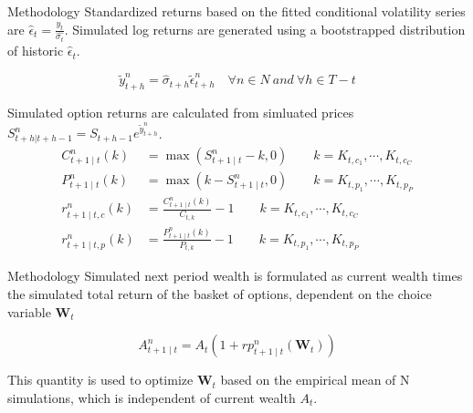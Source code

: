 \documentclass[9pt]{beamer}
\begin{document}
\begin{frame}{Methodology}
Standardized returns based on the fitted conditional volatility series are $\hat{\epsilon}_{t} = \frac{y_{t}}{\hat{\sigma_{t}}}$. Simulated log returns are generated using a bootstrapped distribution of historic $\hat{\epsilon}_{t}$.

\[\tilde{y}^{n}_{t + h} = \hat{\sigma}_{t + h} \tilde{\epsilon}^{n}_{t + h} \quad \forall n \in N \ and \ \forall h \in T - t\]

\vspace{1cm}

Simulated option returns are calculated from simluated prices $S_{t + h|t+h-1}^{n} = S_{t + h - 1} e^{\tilde{y}_{t + h}^{n}}$.
\noindent
\begin{align} 
\nonumber C_{t+1 \mid t}^{n}(k) &= \max (S_{t+1 \mid t}^{n} - k, 0) \quad \quad k = K_{t, c_{1}}, \cdots, K_{t, c_{C}} 
\\ \nonumber P_{t+1 \mid t}^{n}(k) &= \max (k - S_{t+1 \mid t}^{n}, 0) \quad \quad k = K_{t, p_{1}}, \cdots, K_{t, p_{P}}
\\ \nonumber r_{t+1 \mid t, c}^{n}(k) &= \frac{C_{t+1 \mid t}^{n}(k)}{C_{t, k}} - 1 \quad \quad k = K_{t, c_{1}}, \cdots, K_{t, c_{C}}
\\ \nonumber r_{t+1 \mid t, p}^{n}(k) &= \frac{P_{t+1 \mid t}^{n}(k)}{P_{t, k}} - 1 \quad \quad k = K_{t, p_{1}}, \cdots, K_{t, p_{P}}
\end{align}
\end{frame}

\begin{frame}{Methodology}
Simulated next period wealth is formulated as current wealth times the simulated total return of the basket of options, dependent on the choice variable $\mathbf{W}_{t}$

\[A_{t+1 \mid t}^{n} = A_{t}(1 + rp_{t + 1 \mid t}^{n}(\mathbf{W}_{t}))\]

This quantity is used to optimize $\mathbf{W}_{t}$ based on the empirical mean of N simulations, which is independent of current wealth $A_{t}$.
\end{frame}
\end{document}
